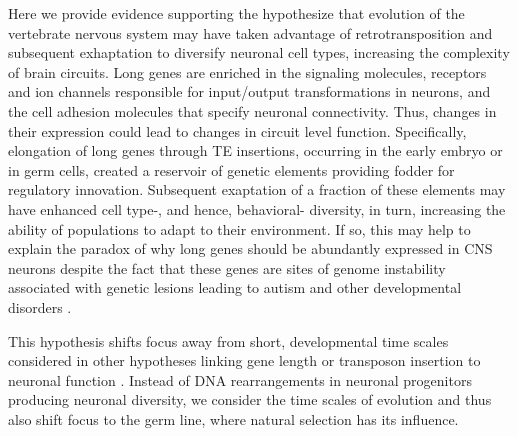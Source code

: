 Here we provide evidence supporting the hypothesize that evolution of the vertebrate nervous system may have taken advantage of retrotransposition and subsequent exhaptation to diversify neuronal cell types, increasing the complexity of brain circuits. Long genes are enriched in the signaling molecules, receptors and ion channels responsible for input/output transformations in neurons, and the cell adhesion molecules that specify neuronal connectivity. Thus, changes in their expression could lead to changes in circuit level function. Specifically, elongation of long genes through TE insertions, occurring in the early embryo or in germ cells, created a reservoir of genetic elements providing fodder for regulatory innovation. Subsequent exaptation of a fraction of these elements may have enhanced cell type-, and hence, behavioral- diversity, in turn, increasing the ability of populations to adapt to their environment. If so, this may help to explain the paradox of why long genes should be abundantly expressed in CNS neurons despite the fact that these genes are sites of genome instability associated with genetic lesions leading to autism and other developmental disorders \cite{Wei_2016}. 

This hypothesis shifts focus away from short, developmental time scales considered in other hypotheses linking gene length or transposon insertion to neuronal function \cite{Muotri_2005}\cite{Richardson_2014}\cite{Perrat_2013}. Instead of DNA rearrangements in neuronal progenitors producing neuronal diversity, we consider the time scales of evolution and thus also shift focus to the germ line, where natural selection has its influence. 

